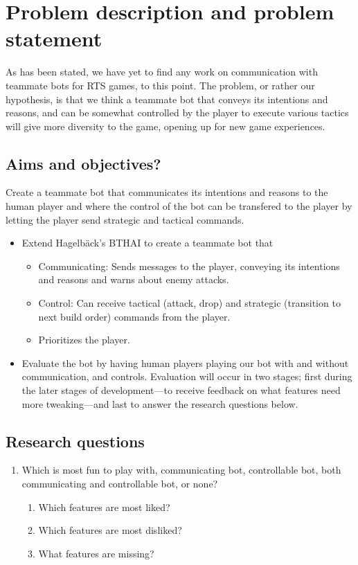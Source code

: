 \chapter{Problem description and problem statement}
As has been stated, we have yet to find any work on communication with teammate bots for RTS games, to this point. The problem, or rather our hypothesis, is that we think a teammate bot that conveys its intentions and reasons, and can be somewhat controlled by the player to execute various tactics will give more diversity to the game, opening up for new game experiences.

\section{Aims and objectives?}
Create a teammate bot that communicates its intentions and reasons to the human player and where the control of the bot can be transfered to the player by letting the player send strategic and tactical commands.
\begin{itemize}
	\item Extend Hagelbäck's BTHAI\cite{bthai} to create a teammate bot that
	\begin{itemize}
		\item Communicating: Sends messages to the player, conveying its intentions and reasons and
		  warns about enemy attacks.
		\item Control: Can receive tactical (attack, drop) and strategic (transition to next build order) commands from the player.
		\item Prioritizes the player. 
	\end{itemize}
	\item Evaluate the bot by having human players playing our bot with and without communication, and controls. Evaluation will occur in two stages; first during the later stages of development—to receive feedback on what features need more tweaking—and last to answer the research questions below.
\end{itemize}

\section{Research questions}
\renewcommand{\theenumii}{\arabic{enumi}.\arabic{enumii}}
\renewcommand{\labelenumii}{\theenumii.}
\begin{enumerate}
	\item	Which is most fun to play with, communicating bot, controllable bot, both communicating and controllable bot, or none?
	\begin{enumerate}
		\item Which features are most liked?
		\item Which features are most disliked?
		\item What features are missing?
	\end{enumerate}
\end{enumerate}

